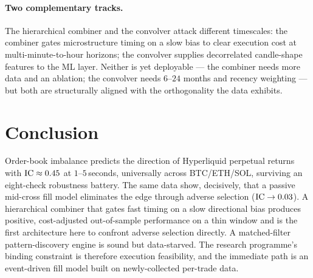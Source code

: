 \documentclass[11pt]{article}
\newcommand{\ic}{\textnormal{IC}}
\begin{document}
\paragraph{Two complementary tracks.} The hierarchical combiner and the convolver attack
different timescales: the combiner gates microstructure timing on a slow bias to clear
execution cost at multi-minute-to-hour horizons; the convolver supplies decorrelated
candle-shape features to the ML layer. Neither is yet deployable --- the combiner needs more
data and an ablation; the convolver needs $6$--$24$ months and recency weighting --- but
both are structurally aligned with the orthogonality the data exhibits.

\section{Conclusion}\label{sec:conclusion}

Order-book imbalance predicts the direction of Hyperliquid perpetual returns with
$\ic \approx 0.45$ at $1$--$5\,$seconds, universally across BTC/ETH/SOL, surviving an
eight-check robustness battery. The same data show, decisively, that a passive mid-cross
fill model eliminates the edge through adverse selection ($\ic \to 0.03$). A hierarchical
combiner that gates fast timing on a slow directional bias produces positive, cost-adjusted
out-of-sample performance on a thin window and is the first architecture here to confront
adverse selection directly. A matched-filter pattern-discovery engine is sound but
data-starved. The research programme's binding constraint is therefore execution
feasibility, and the immediate path is an event-driven fill model built on newly-collected
per-trade data.
\end{document}
